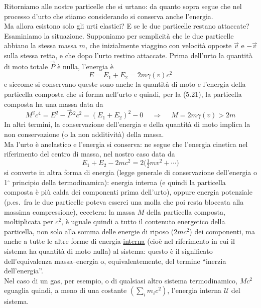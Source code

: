 Ritorniamo alle nostre particelle che si urtano: da quanto sopra segue che nel
processo d'urto che stiamo considerando si conserva anche l'energia.\\
Ma allora esistono solo gli urti elastici? E se le due particelle restano
attaccate? Esaminiamo la situazione. Supponiamo per semplicit\`a che le due
particelle abbiano la stessa massa $m$, che inizialmente viaggino con velocit\`a
opposte $\vec v$ e $-\vec v$ sulla stessa retta, e che dopo l'urto restino
attaccate. Prima dell'urto la quantit\`a di moto totale $\vec P$ \`e nulla,
l'energia \`e
\begin{equation}
  E=E_1+E_2=2m\gamma(v)c^2
  \tag{5.26}
\end{equation}
e siccome si conservano queste sono anche la quantit\`a di moto e l'energia
della particella composta che si forma nell'urto e quindi, per la (5.21), la
particella composta ha una massa data da
\begin{equation}
  M^2c^4=E^2-\vec P\,^2c^2=(E_1+E_2)^2-0
  \quad\ \Rightarrow\quad\ M=2m\gamma(v)>2m
  \tag{5.27}
\end{equation}
In altri termini, la conservazione dell'energia e della quantit\`a di moto
implica la non conservazione (o la non additivit\`a) della massa.\\
Ma l'urto \`e anelastico e l'energia si conserva: ne segue che l'energia
cinetica nel riferimento del centro di massa, nel nostro caso data da
\begin{equation}
  E_1+E_2-2mc^2=2\big(\tfrac{1}{2}mv^2+\cdots\big)
  \tag{5.28}
\end{equation}
si converte in altra forma di energia (legge generale di conservazione
dell'energia o 1$^\circ$ principio della termodinamica): energia interna (e
quindi la particella composta \`e pi\`u calda dei componenti prima dell'urto),
oppure energia potenziale (p.es.\ fra le due particelle poteva esserci una molla
che poi resta bloccata alla massima compressione), eccetera: la massa $M$ della
particella composta, moltiplicata per $c^2$, \`e uguale quindi a tutto il
contenuto energetico della particella, non solo alla somma delle energie di
riposo ($2mc^2$) dei componenti, ma anche a tutte le altre forme di energia
\underline{interna} (cio\`e nel riferimento in cui il sistema ha quantit\`a di
moto nulla) al sistema: questo \`e il significato dell'equivalenza
massa--energia o, equivalentemente, del termine ``inerzia dell'energia''.\\
Nel caso di un gas, per esempio, o di qualsiasi altro sistema termodinamico,
$Mc^2$ eguaglia quindi, a meno di una costante $(\sum_im_ic^2)$, l'energia
interna $\mathcal U$ del sistema.

